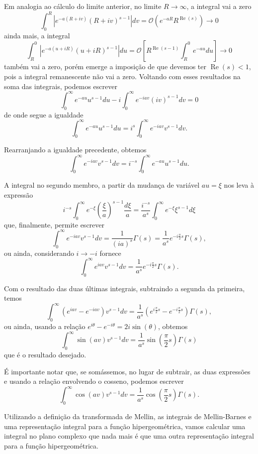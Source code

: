 {Em analogia ao cálculo do limite anterior, no limite $R \to \infty$, a integral vai a zero
$$
\int_{0}^{R}
\left|
e^{-a(R+iv)} (R + iv)^{s-1}
\right|
dv = \mathscr{O}(e^{-aR} R^{\operatorname{Re}(s)}) \to 0$$
ainda mais, a integral
$$
\int_{R}^{0}
\left|
e^{-a(u+iR)} (u + iR)^{s-1}
\right|
du =
\mathscr{O}
\left[
R^{\operatorname{Re}(s-1)}
\int_{R}^{0}
e^{-au} du
\right]
\to 0$$
também vai a zero, porém emerge a imposição de que devemos ter $\operatorname{Re}(s) < 1$, pois a integral remanescente não vai a zero. Voltando com esses resultados na soma das integrais, podemos escrever
$$
\int_{0}^{\infty}
e^{-au} u^{s-1} du - i
\int_{0}^{\infty}
e^{-iav} (iv)^{s-1} dv = 0$$
de onde segue a igualdade
$$
\int_{0}^{\infty}
e^{-au} u^{s-1} du = i^s
\int_{0}^{\infty}
e^{-iav} v^{s-1} dv.$$

Rearranjando a igualdade precedente, obtemos
$$\int_{0}^{\infty}
e^{-iav} v^{s-1} dv = i^{-s}
\int_{0}^{\infty}
e^{-au} u^{s-1} du.$$

A integral no segundo membro, a partir da mudança de variável $au = \xi$ nos leva à expressão
$$i^{-s}
\int_{0}^{\infty}
e^{-\xi}
\left(
\dfrac{\xi}{a}
\right)^{s-1} \dfrac{d\xi}{a}
=
\dfrac{i^{-s}}{a^s}
\int_{0}^{\infty}
e^{-\xi} \xi^{s-1} d\xi$$
que, finalmente, permite escrever
$$\int_{0}^{\infty}
e^{-iav} v^{s-1} dv =
\dfrac{1}{(ia)^s} \Gamma(s) =
\dfrac{1}{a^s} e^{-i \frac{\pi}{2}s} \Gamma(s),$$
ou ainda, considerando $i \to -i$ fornece
$$\int_{0}^{\infty}
e^{iav} v^{s-1} dv =
\dfrac{1}{a^s} e^{-i \frac{\pi}{2}s} \Gamma(s).$$

Com o resultado das duas últimas integrais, subtraindo a segunda da primeira, temos
$$\int_{0}^{\infty}
\left(e^{iav} - e^{-iav}\right)
v^{s-1} dv =
\dfrac{1}{a^s}
\left(
e^{i \frac{\pi}{2}s}
-
e^{-i \frac{\pi}{2}s}
\right)
\Gamma(s),$$
ou ainda, usando a relação $e^{i\theta} - e^{-i\theta} = 2i \sin(\theta)$, obtemos
$$\int_{0}^{\infty}
\sin(av) v^{s-1} dv =
\dfrac{1}{a^{s}}
\sin\left(\dfrac{\pi}{2}s\right)
\Gamma(s)$$
que é o resultado desejado.
}

É importante notar que, se somássemos, no lugar de subtrair, as duas expressões e usando a relação envolvendo o cosseno, podemos escrever
$$
\int_{0}^{\infty}
\cos(av) v^{s-1} dv =
\dfrac{1}{a^s}
\cos\left(\dfrac{\pi}{2} s\right)
\Gamma(s).$$

Utilizando a definição da transformada de Mellin, as integrais de Mellin-Barnes e uma representação integral para a função hipergeométrica, vamos calcular uma integral no plano complexo que nada mais é que uma outra representação integral para a função hipergeométrica.

